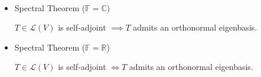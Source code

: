 \documentclass[11pt,fleqn]{book} %
\begin{document}
\begin{theorem}
$\text{ }$

    \begin{itemize}
        \item Spectral Theorem ($\mathbb{F} = \mathbb{C}$)

        $T \in \mathcal{L}(V)$ is self-adjoint $\implies T$ admits an orthonormal eigenbasis.

        \item Spectral Theorem ($\mathbb{F} = \mathbb{R}$)

        $T \in \mathcal{L}(V)$ is self-adjoint $\iff T$ admits an orthonormal eigenbasis.
    \end{itemize}
\end{theorem}
\setcounter{section}{5}
\end{document}
